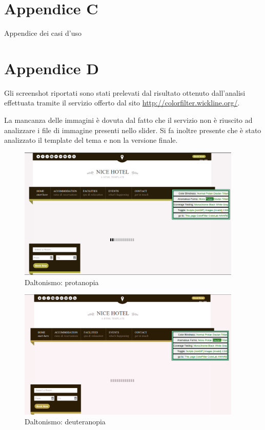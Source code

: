 \documentclass[a4paper,12pt,hidelinks]{report}
\begin{document}
\section{Appendice C}
Appendice dei casi d'uso
\section{Appendice D}
Gli screenshot riportati sono stati prelevati dal risultato ottenuto dall'analisi effettuata tramite il servizio offerto dal sito \url{http://colorfilter.wickline.org/}. 
\par La mancanza delle immagini è dovuta dal fatto che il servizio non è riuscito ad analizzare i file di immagine presenti nello slider. Si fa inoltre presente che è stato 
analizzato il template del tema e non la versione finale.
\begin{figure}[h!]%
  \includegraphics[width=0.95\textwidth,keepaspectratio=true]{img/daltonismoProtanopia}
  \centering
  \caption{Daltonismo: protanopia}%
  \label{fig:daltonismoProtanopia}%
\end{figure}

\begin{figure}[h!]%
  \includegraphics[width=0.95\textwidth,keepaspectratio=true]{img/daltonismoDeuteranopia}
  \centering
  \caption{Daltonismo: deuteranopia}%
  \label{fig:daltonismoDeuteranopia}%
\end{figure}
\end{document}
